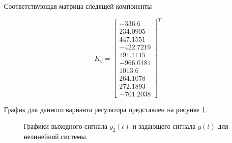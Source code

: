 Соответствующая матрица следящей компоненты

$$K_g = \begin{bmatrix}
	-336.6\\	234.0905\\	447.1551\\	-422.7219\\	191.4115\\	-966.0481\\	1013.6\\	264.1078\\	272.1893\\	-701.2038
\end{bmatrix}^T$$

График для данного варианта регулятора представлен на рисунке \ref{5_g_nonlin_1}.
\begin{figure}[!h]
	\caption{Графики выходного сигнала $y_2(t)$ и задающего сигнала $g(t)$ для нелинейной системы.}
	\label{5_g_nonlin_1}
\end{figure}

\endinput